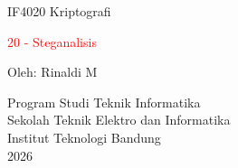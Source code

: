 \documentclass{article}
\begin{document}

\begin{center}
IF4020 Kriptografi

\Huge \textcolor{red}{20 - Steganalisis}

\vspace{40mm}

\large Oleh: Rinaldi M

\vspace{10mm}

Program Studi Teknik Informatika \\
Sekolah Teknik Elektro dan Informatika \\
Institut Teknologi Bandung \\
2026
\end{center}
\end{document}
